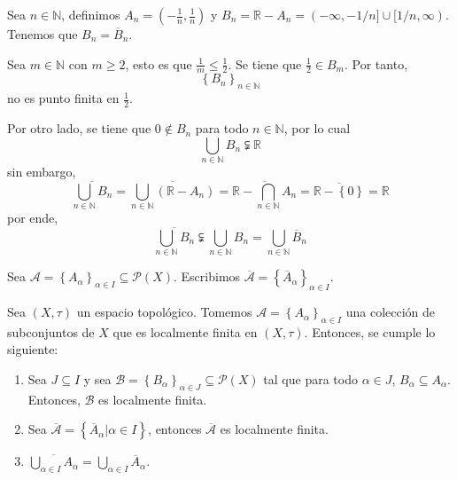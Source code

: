 \documentclass[12pt]{report}
\newcounter{it}
\theoremstyle{largebreak}
\begin{document}
    \begin{exa}[\textbf{**}]
        Sea $n\in\mathbb{N}$, definimos $A_n=\left(-\frac{1}{n},\frac{1}{n}\right)$ y $B_n=\mathbb{R}-A_n=(-\infty,-1/n]\cup[1/n,\infty)$. Tenemos que $B_n=\overline{B}_n$.

        Sea $m\in\mathbb{N}$ con $m\geq 2$, esto es que $\frac{1}{m}\leq\frac{1}{2}$. Se tiene que $\frac{1}{2}\in B_m$. Por tanto,
        \begin{equation*}
            \left\{B_n\right\}_{n\in\mathbb{N}}
        \end{equation*}
        no es punto finita en $\frac{1}{2}$.

        Por otro lado, se tiene que $0\notin B_n$ para todo $n\in\mathbb{N}$, por lo cual
        \begin{equation*}
            \bigcup_{ n\in\mathbb{N}}B_n\subsetneqq \mathbb{R}
        \end{equation*}
        sin embargo,
        \begin{equation*}
            \overline{\bigcup_{ n\in\mathbb{N}}B_n}=\overline{\bigcup_{ n\in\mathbb{N}}(\mathbb{R}-A_n)}=\overline{\mathbb{R}-\bigcap_{ n\in\mathbb{N}}A_n}=\overline{\mathbb{R}-\left\{ 0\right\}}=\mathbb{R}
        \end{equation*}
        por ende,
        \begin{equation*}
            \overline{\bigcup_{ n\in\mathbb{N}}B_n}\subsetneqq \bigcup_{ n\in\mathbb{N}}B_n=\bigcup_{ n\in\mathbb{N}}\overline{B}_n
        \end{equation*}
    \end{exa}

    \begin{obs}
        Sea $\mathcal{A}=\left\{A_\alpha \right\}_{\alpha\in I}\subseteq\mathcal{P}(X)$. Escribimos $\overline{\mathcal{A}}=\left\{\overline{A}_\alpha \right\}_{\alpha\in I}$.
    \end{obs}

    \begin{propo}
        Sea $(X,\tau)$ un espacio topológico. Tomemos $\mathcal{A}=\left\{A_\alpha \right\}_{\alpha\in I}$ una colección de subconjuntos de $X$ que es localmente finita en $(X,\tau)$. Entonces, se cumple lo siguiente:
        \begin{enumerate}
            \item Sea $J\subseteq I$ y sea $\mathcal{B}=\left\{B_\alpha \right\}_{\alpha\in J}\subseteq\mathcal{P}(X)$ tal que para todo $\alpha\in J$, $B_\alpha\subseteq A_\alpha$. Entonces, $\mathcal{B}$ es localmente finita.
            \item Sea $\overline{\mathcal{A}}=\left\{\overline{A}_\alpha\Big|\alpha\in I \right\}$, entonces $\overline{\mathcal{A}}$ es localmente finita.
            \item $\overline{\bigcup_{\alpha\in I}A_\alpha}=\bigcup_{ \alpha\in I}\overline{A}_\alpha$.
        \end{enumerate}
    \end{propo}
\end{document}

